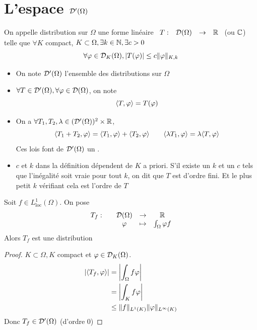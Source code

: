 \documentclass[]{report}
\begin{document}
    \section{L'espace $\mathcal{D}'(\Omega)$}

    \begin{df}{}{}
        On appelle distribution sur $\Omega$ une forme linéaire $\begin{array}{ccccc} T : & \mathcal{D}(\Omega) & \to & \mathbb{R} \end{array}$ (ou $\mathbb{C}$) telle que $\forall K$ compact, $K\subset \Omega, \exists k\in \mathbb{N},\exists c>0$
        \[\forall \varphi\in \mathcal{D}_K(\Omega), \left|T(\varphi)\right|\le c\lVert \varphi \rVert_{K,k}\]
    \end{df}

    \begin{nt}{}{}
        \begin{itemize}
            \item On note $\mathcal{D}'(\Omega)$ l'ensemble des distributions sur $\Omega$
            \item $\forall T\in \mathcal{D}'(\Omega),\forall \varphi\in \mathcal{D}(\Omega)$, on note
            \[\langle T,\varphi \rangle=T(\varphi)\]
            \item On a $\forall T_1,T_2,\lambda\in (\mathcal{D}'(\Omega))^2\times \mathbb{R}$,
            \[\langle T_1+T_2,\varphi \rangle= \langle T_1,\varphi \rangle+\langle T_2,\varphi \rangle\qquad\langle \lambda T_1,\varphi \rangle=\lambda \langle T,\varphi \rangle\]
            Ces lois font de $\mathcal{D}'(\Omega)$ un \ev.
            \item $c$ et $k$ dans la définition dépendent de $K$ a priori. S'il existe un $k$ et un $c$ tels que l'inégalité soit vraie pour tout $k$, on dit que $T$ est d'ordre fini. Et le plus petit $k$ vérifiant cela est l'ordre de $T$
        \end{itemize}
    \end{nt}

    \begin{prop}{}{}
        Soit $f\in L^1_{\text{loc}}(\Omega)$. On pose
        \[\begin{array}{ccccc} T_f : & & \mathcal{D}(\Omega) & \to & \mathbb{R} \\ & & \varphi & \mapsto & \int_\Omega \varphi f \end{array}\]
        Alors $T_f$ est une distribution
    \end{prop}

    \begin{proof}
        $K\subset \Omega,K$ compact et $\varphi\in \mathcal{D}_K(\Omega)$.
        \begin{align*}
            \left|\langle T_f,\varphi \rangle\right|&=\left|\int_\Omega f\varphi\right|\\
            &=\left|\int_{K}f\varphi\right|\\
            &\le\lVert f \rVert_{L^1(K)}\lVert \varphi \rVert_{L^\infty(K)}
        \end{align*}
        Donc $T_f\in \mathcal{D}'(\Omega)$ (d'ordre 0)
    \end{proof}
\end{document}
